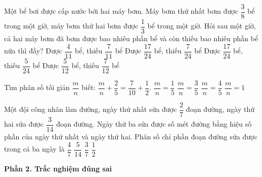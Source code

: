 \begin{ex} %
Một bể bơi được cấp nước bởi hai máy bơm. Máy bơm thứ nhất bơm được $\dfrac{3}{8}$ bể trong một giờ, máy bơm thứ hai bơm được $\dfrac{1}{3}$ bể trong một giờ. Hỏi sau một giờ, cả hai máy bơm đã bơm được bao nhiêu phần bể và còn thiếu bao nhiêu phần bể nữa thì đầy?
\choice
{Được $\dfrac{4}{11}$ bể, thiếu $\dfrac{7}{11}$ bể}
{\True Được $\dfrac{17}{24}$ bể, thiếu $\dfrac{7}{24}$ bể}
{Được $\dfrac{17}{24}$ bể, thiếu $\dfrac{5}{24}$ bể}
{Được $\dfrac{5}{12}$ bể, thiếu $\dfrac{7}{12}$ bể}
\end{ex}

\begin{ex} %
Tìm phân số tối giản $\dfrac{m}{n}$ biết: $\dfrac{m}{n} + \dfrac{2}{5} = \dfrac{7}{10} + \dfrac{1}{2}$.
\choice
{$\dfrac{m}{n} = \dfrac{1}{5}$}
{$\dfrac{m}{n} = \dfrac{3}{5}$}
{\True $\dfrac{m}{n} = \dfrac{4}{5}$}
{$\dfrac{m}{n} = 1$}
\end{ex}

\begin{ex} %
Một đội công nhân làm đường, ngày thứ nhất sửa được $\dfrac{2}{7}$ đoạn đường, ngày thứ hai sửa được $\dfrac{3}{14}$ đoạn đường. Ngày thứ ba sửa được số mét đường bằng hiệu số phần của ngày thứ nhất và ngày thứ hai. Phân số chỉ phần đoạn đường sửa được trong cả ba ngày là
\choice
{\True $\dfrac{4}{7}$}
{$\dfrac{5}{14}$}
{$\dfrac{3}{7}$}
{$\dfrac{1}{2}$}
\end{ex}

\textbf{Phần 2. Trắc nghiệm đúng sai}

